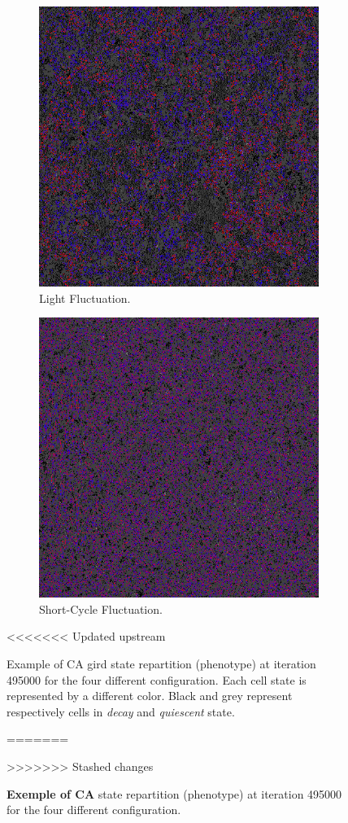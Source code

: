 \begin{figure}[H]
\begin{subfigure}{.25\textwidth}
  \centering
  \includegraphics[width=.9\linewidth]{img/light495000}
  \caption{Light Fluctuation.}
\end{subfigure}%
\begin{subfigure}{.25\textwidth}
  \centering
  \includegraphics[width=.9\linewidth]{img/small495000}
  \caption{Short-Cycle Fluctuation.}
\end{subfigure}
<<<<<<< Updated upstream
\caption{Example of CA gird state repartition (phenotype) at iteration 495000 for the four different configuration. Each cell state is represented by a different color. Black and grey represent respectively cells in \emph{decay} and \emph{quiescent} state.}
=======
\caption{\textbf{Exemple of CA} state repartition (phenotype) at iteration 495000 for the four different configuration.}
>>>>>>> Stashed changes
\label{fig:phenoexpl}
\end{figure}


